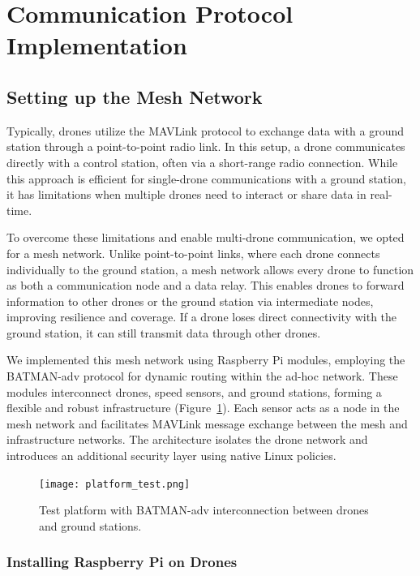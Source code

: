 
\section{Communication Protocol Implementation}

\subsection{Setting up the Mesh Network}

Typically, drones utilize the MAVLink protocol to exchange data with a ground station through a point-to-point radio link. In this setup, a drone communicates directly with a control station, often via a short-range radio connection. While this approach is efficient for single-drone communications with a ground station, it has limitations when multiple drones need to interact or share data in real-time.

To overcome these limitations and enable multi-drone communication, we opted for a mesh network. Unlike point-to-point links, where each drone connects individually to the ground station, a mesh network allows every drone to function as both a communication node and a data relay. This enables drones to forward information to other drones or the ground station via intermediate nodes, improving resilience and coverage. If a drone loses direct connectivity with the ground station, it can still transmit data through other drones.

We implemented this mesh network using Raspberry Pi modules, employing the BATMAN-adv protocol for dynamic routing within the ad-hoc network. These modules interconnect drones, speed sensors, and ground stations, forming a flexible and robust infrastructure (Figure~\ref{fig:test_platform}). Each sensor acts as a node in the mesh network and facilitates MAVLink message exchange between the mesh and infrastructure networks. The architecture isolates the drone network and introduces an additional security layer using native Linux policies.

\begin{figure}[h!]
\centering
\texttt{[image: platform\_test.png]}
\caption{Test platform with BATMAN-adv interconnection between drones and ground stations.}
\label{fig:test_platform}
\end{figure}

\subsubsection{Installing Raspberry Pi on Drones}

